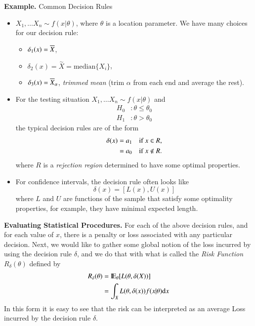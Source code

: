 \documentclass[11pt,english]{scrbook}
\begin{document}
\textbf{Example.} Common Decision Rules
\begin{itemize}
\item \(X_{1},\ldots X_{n}\sim f(x|\theta)\), where \(\theta\) is a location parameter. We have many choices for our decision rule:
\begin{itemize}
\item \(\delta_{1}(x)=\overline{X}\),
\item \(\delta_{2}(x)=\overset{\sim}{X}=\mathrm{median}\{X_{i}\}\),
\item \(\delta_{3}(x)=\overline{X}_{\alpha}\), \emph{trimmed mean} (trim \(\alpha\) from each end and average the rest).
\end{itemize}

\item For the testing situation \(X_{1},\ldots X_{n}\sim f(x|\theta)\) and
\begin{align*}
H_{0} & :\theta \leq \theta_{0}\\
H_{1} & :\theta > \theta_{0}
\end{align*}
the typical decision rules are of the form 
\begin{align*}
\delta(x) & =a_{1}\quad\mbox{if \ensuremath{x\in R},}\\
& =a_{0}\quad\mbox{if \ensuremath{x\notin R}.}
\end{align*}
where \(R\) is a \emph{rejection region} determined to have some optimal properties.
\item For confidence intervals, the decision rule often looks like 
\[
   \delta(x)=[L(x),U(x)]
   \]
where \(L\) and \(U\) are functions of the sample that satisfy some optimality properties, for example, they have minimal expected length.
\end{itemize}


\textbf{Evaluating Statistical Procedures.} For each of the above decision rules, and for each value of \(x\), there is a penalty or loss associated with any particular decision. Next, we would like to gather some global notion of the loss incurred by using the decision rule \(\delta\), and we do that with what is called the \emph{Risk Function} \(R_{\delta}(\theta)\) defined by 
\begin{align*}
R_{\delta}(\theta) & =\mathrm{I\hspace{-1.5pt}E}_{\theta}[L(\theta,\delta(X))]\\
 & =\int_{\mathfrak{X}}L(\theta,\delta(x))f(x|\theta)\mathrm{d} x
\end{align*}
In this form it is easy to see that the risk can be interpreted as an average Loss incurred by the decision rule \(\delta\).
\end{document}
